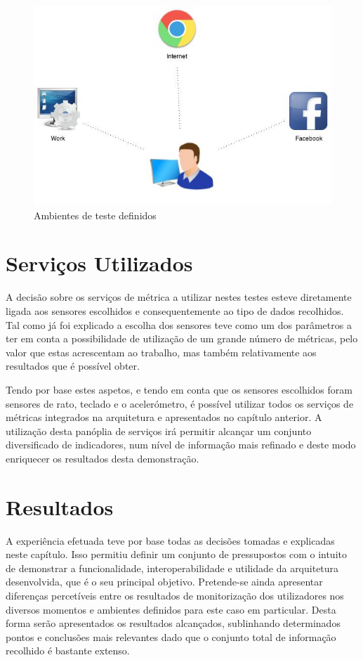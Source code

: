 \begin{figure}[htb]
   \centering
   \includegraphics[scale=0.45]{Images/ambientesestudo.jpg}
   \caption{Ambientes de teste definidos}
\end{figure}

\section{Serviços Utilizados}

A decisão sobre os serviços de métrica a utilizar nestes testes esteve diretamente ligada aos sensores escolhidos e consequentemente ao tipo de dados recolhidos. Tal como já foi explicado a escolha dos sensores teve como um dos parâmetros a ter em conta a possibilidade de utilização de um grande número de métricas, pelo valor que estas acrescentam ao trabalho, mas também relativamente aos resultados que é possível obter.

Tendo por base estes aspetos, e tendo em conta que os sensores escolhidos foram sensores de rato, teclado e o acelerómetro, é possível utilizar todos os serviços de métricas integrados na arquitetura e apresentados no capítulo anterior. A utilização desta panóplia de serviços irá permitir alcançar um conjunto diversificado de indicadores, num nível de informação mais refinado e deste modo enriquecer os resultados desta demonstração.

\section{Resultados}

A experiência efetuada teve por base todas as decisões tomadas e explicadas neste capítulo. Isso permitiu definir um conjunto de pressupostos com o intuito de demonstrar a funcionalidade, interoperabilidade e utilidade da arquitetura desenvolvida, que é o seu principal objetivo. Pretende-se ainda apresentar diferenças percetíveis entre os resultados de monitorização dos utilizadores nos diversos momentos e ambientes definidos para este caso em particular. Desta forma serão apresentados os resultados alcançados, sublinhando determinados pontos e conclusões mais relevantes dado que o conjunto total de informação recolhido é bastante extenso.

